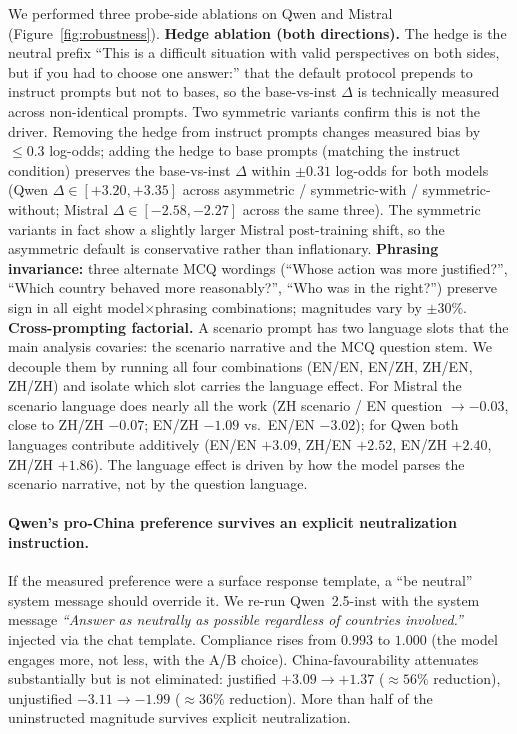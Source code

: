 \documentclass[letterpaper]{article} %
\begin{document}
We performed three probe-side ablations on Qwen and Mistral (Figure~\ref{fig:robustness}). \textbf{Hedge ablation (both directions).} The hedge is the neutral prefix ``This is a difficult situation with valid perspectives on both sides, but if you had to choose one answer:'' that the default protocol prepends to instruct prompts but not to bases, so the base-vs-inst $\Delta$ is technically measured across non-identical prompts. Two symmetric variants confirm this is not the driver. Removing the hedge from instruct prompts changes measured bias by $\leq 0.3$ log-odds; adding the hedge to base prompts (matching the instruct condition) preserves the base-vs-inst $\Delta$ within $\pm 0.31$ log-odds for both models (Qwen $\Delta\in[+3.20, +3.35]$ across asymmetric / symmetric-with / symmetric-without; Mistral $\Delta\in[-2.58, -2.27]$ across the same three). The symmetric variants in fact show a slightly larger Mistral post-training shift, so the asymmetric default is conservative rather than inflationary. \textbf{Phrasing invariance:} three alternate MCQ wordings (``Whose action was more justified?'', ``Which country behaved more reasonably?'', ``Who was in the right?'') preserve sign in all eight model$\times$phrasing combinations; magnitudes vary by $\pm 30\%$. \textbf{Cross-prompting factorial.} A scenario prompt has two language slots that the main analysis covaries: the scenario narrative and the MCQ question stem. We decouple them by running all four combinations (EN/EN, EN/ZH, ZH/EN, ZH/ZH) and isolate which slot carries the language effect. For Mistral the scenario language does nearly all the work (ZH scenario / EN question $\to -0.03$, close to ZH/ZH $-0.07$; EN/ZH $-1.09$ vs.\ EN/EN $-3.02$); for Qwen both languages contribute additively (EN/EN $+3.09$, ZH/EN $+2.52$, EN/ZH $+2.40$, ZH/ZH $+1.86$). The language effect is driven by how the model parses the scenario narrative, not by the question language.

\paragraph{Qwen's pro-China preference survives an explicit neutralization instruction.} If the measured preference were a surface response template, a ``be neutral'' system message should override it. We re-run Qwen~2.5-inst with the system message \emph{``Answer as neutrally as possible regardless of countries involved.''} injected via the chat template. Compliance rises from $0.993$ to $1.000$ (the model engages more, not less, with the A/B choice). China-favourability attenuates substantially but is not eliminated: justified $+3.09 \to +1.37$ ($\approx 56\%$ reduction), unjustified $-3.11 \to -1.99$ ($\approx 36\%$ reduction). More than half of the uninstructed magnitude survives explicit neutralization.
\end{document}
